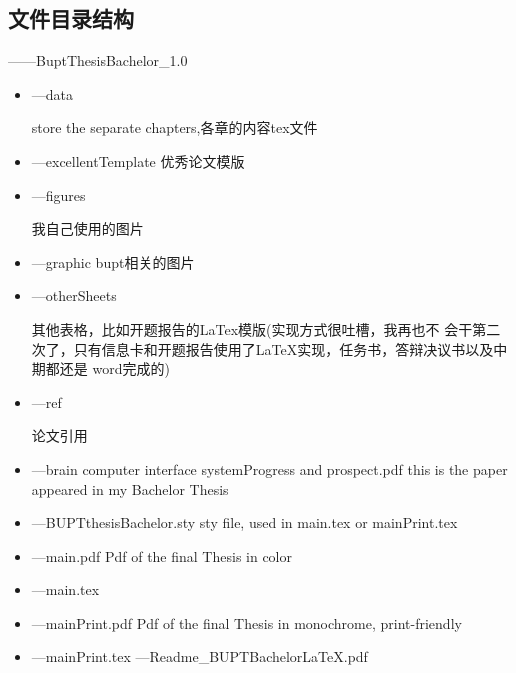 \documentclass[a4paper,oneside,xetex]{ctexbook}
\begin{document}
\subsection{文件目录结构}
\begin{description}
\item ------BuptThesisBachelor\_1.0
\begin{itemize}
\item ---data

store the separate chapters,各章的内容tex文件
\item ---excellentTemplate
优秀论文模版
\item ---figures

我自己使用的图片
\item ---graphic
bupt相关的图片
\item ---otherSheets

其他表格，比如开题报告的LaTex模版(实现方式很吐槽，我再也不
会干第二次了，只有信息卡和开题报告使用了LaTeX实现，任务书，答辩决议书以及中期都还是
word完成的)
\item ---ref

论文引用
\item ---brain computer interface systemProgress and prospect.pdf
this is the paper appeared in my Bachelor Thesis
\item ---BUPTthesisBachelor.sty
sty file, used in main.tex or mainPrint.tex
\item ---main.pdf
Pdf of the final Thesis in color
\item ---main.tex
\item ---mainPrint.pdf
Pdf of the final Thesis in monochrome, print-friendly
\item ---mainPrint.tex
---Readme\_BUPTBachelorLaTeX.pdf
\end{itemize}
\end{description}
\end{document}

